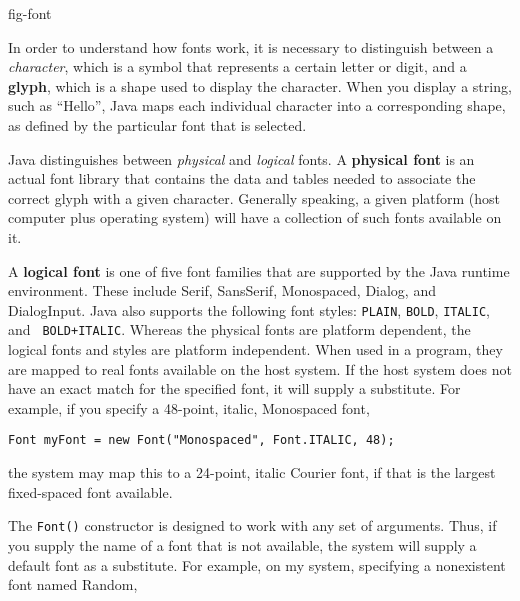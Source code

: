 {fig-font}

In order to understand how fonts work, it is necessary to distinguish
between a {\em character}, which is a symbol that represents a certain
letter or digit, and a {\bf glyph}, which is a shape used to display
the character.  When you display a string, such as ``Hello'', Java
maps each individual character into a corresponding shape, as defined
by the particular font that is selected. 

Java distinguishes between {\em physical} and {\em logical} fonts.  A
{\bf physical font} is an actual font library that contains the data
and tables needed to associate the correct glyph with a given
character.  Generally speaking, a given platform (host computer plus
operating system) will have a collection of such fonts available on
it.

A {\bf logical font} is one of five font families that are supported
by the Java runtime environment. These include Serif, SansSerif,
Monospaced, Dialog, and DialogInput.  Java also supports the following
font styles: {\tt PLAIN}, {\tt BOLD}, {\tt ITALIC}, and {\tt
BOLD+ITALIC}.  Whereas the physical fonts are platform dependent, the
logical fonts and styles are platform independent. When used in a
program, they are mapped to real fonts available on the host system.
If the host system does not have an exact match for the specified
font, it will supply a substitute.  For example, if you specify a
48-point, italic, Monospaced font,

\begin{jjjlisting}
\begin{lstlisting}
Font myFont = new Font("Monospaced", Font.ITALIC, 48);
\end{lstlisting}
\end{jjjlisting}

\noindent the system may map this to a 24-point, italic
Courier font, if that is the largest fixed-spaced font available.

The {\tt Font()} constructor is designed to work with any set of
arguments.  Thus, if you supply the name of a font that is not
available, the system will supply a default font as a substitute.  For
example, on my system, specifying a nonexistent font named Random,

